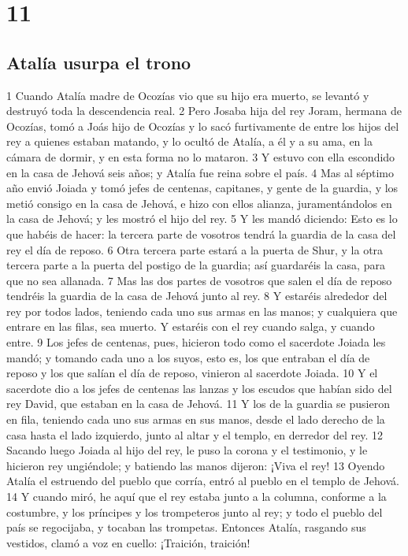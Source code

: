 \chapter{11}

\section*{Atalía usurpa el trono}

1 Cuando Atalía madre de Ocozías vio que su hijo era muerto, se levantó y destruyó toda la descendencia real.
2 Pero Josaba hija del rey Joram, hermana de Ocozías, tomó a Joás hijo de Ocozías y lo sacó furtivamente de entre los hijos del rey a quienes estaban matando, y lo ocultó de Atalía, a él y a su ama, en la cámara de dormir, y en esta forma no lo mataron. 
3 Y estuvo con ella escondido en la casa de Jehová seis años; y Atalía fue reina sobre el país.
4 Mas al séptimo año envió Joiada y tomó jefes de centenas, capitanes, y gente de la guardia, y los metió consigo en la casa de Jehová, e hizo con ellos alianza, juramentándolos en la casa de Jehová; y les mostró el hijo del rey.
5 Y les mandó diciendo: Esto es lo que habéis de hacer: la tercera parte de vosotros tendrá la guardia de la casa del rey el día de reposo.
6 Otra tercera parte estará a la puerta de Shur, y la otra tercera parte a la puerta del postigo de la guardia; así guardaréis la casa, para que no sea allanada.
7 Mas las dos partes de vosotros que salen el día de reposo tendréis la guardia de la casa de Jehová junto al rey. 
8 Y estaréis alrededor del rey por todos lados, teniendo cada uno sus armas en las manos; y cualquiera que entrare en las filas, sea muerto. Y estaréis con el rey cuando salga, y cuando entre.
9 Los jefes de centenas, pues, hicieron todo como el sacerdote Joiada les mandó; y tomando cada uno a los suyos, esto es, los que entraban el día de reposo y los que salían el día de reposo, vinieron al sacerdote Joiada.
10 Y el sacerdote dio a los jefes de centenas las lanzas y los escudos que habían sido del rey David, que estaban en la casa de Jehová.
11 Y los de la guardia se pusieron en fila, teniendo cada uno sus armas en sus manos, desde el lado derecho de la casa hasta el lado izquierdo, junto al altar y el templo, en derredor del rey.
12 Sacando luego Joiada al hijo del rey, le puso la corona y el testimonio, y le hicieron rey ungiéndole; y batiendo las manos dijeron: ¡Viva el rey!
13 Oyendo Atalía el estruendo del pueblo que corría, entró al pueblo en el templo de Jehová.
14 Y cuando miró, he aquí que el rey estaba junto a la columna, conforme a la costumbre, y los príncipes y los trompeteros junto al rey; y todo el pueblo del país se regocijaba, y tocaban las trompetas. Entonces Atalía, rasgando sus vestidos, clamó a voz en cuello: ¡Traición, traición!
